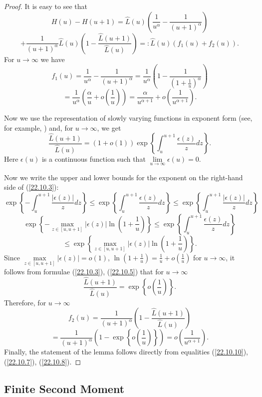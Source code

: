 \documentclass{article}
\theoremstyle{plain}
\theoremstyle{definition}
\theoremstyle{remark}
\newcommand{\beq}{\begin{equation}}
\newcommand{\eeq}{\end{equation}}
\begin{document}
\begin{proof}
It is easy to see that
$$
H(u)-H(u+1)=\widehat{L}(u)\left(\frac{1}{u^\alpha}-\frac{1}{(u+1)^\alpha}\right)
$$
\beq\label{22.10.10}
+\frac{1}{(u+1)^\alpha}\widehat{L}(u)\left(1-\frac{\widehat{L}(u+1)}{\widehat{L}(u)}\right)
=:\widehat{L}(u)(f_1(u)+f_2(u)).
\eeq
For $u\rightarrow\infty$ we have
$$
f_1(u)=\frac{1}{u^\alpha}-\frac{1}{(u+1)^\alpha}
=\frac{1}{u^\alpha}\left(1-\frac{1}{\left(1+\frac{1}{u}\right)^\alpha}\right)
$$
\beq\label{22.10.7}
=\frac{1}{u^\alpha}\left(\frac{\alpha}{u}+o\left(\frac{1}{u}\right)\right)
=\frac{\alpha}{u^{\alpha+1}}+o\left(\frac{1}{u^{\alpha+1}}\right).
\eeq

Now we use the representation of slowly varying functions in exponent form (see, for example, \citet[theorem 1.2]{seneta1985regularly}) and, for $u\rightarrow\infty$, we get
\beq\label{22.10.3}
\frac{\widehat{L}(u+1)}{\widehat{L}(u)}=(1+o(1))\exp\left\{\int_u^{u+1}\frac{\epsilon(z)}{z}dz\right\}.
\eeq
Here $\epsilon(u)$ is a continuous function such that $\lim\limits_{u\rightarrow\infty}\epsilon(u)=0$.

Now we write the upper and lower bounds for the exponent on the right-hand side of (\ref{22.10.3}):
$$
\exp\left\{-\int_u^{u+1}\frac{|\epsilon(z)|}{z}dz\right\}\leq
\exp\left\{\int_u^{u+1}\frac{\epsilon(z)}{z}dz\right\}
\leq\exp\left\{\int_u^{u+1}\frac{|\epsilon(z)|}{z}dz\right\}
$$
$$
\exp\left\{-\max\limits_{z\in[u,u+1]}|\epsilon(z)|\ln\left(1+\frac{1}{u}\right)\right\}\leq
\exp\left\{\int_u^{u+1}\frac{\epsilon(z)}{z}dz\right\}
$$
\beq\label{22.10.5}
\leq\exp\left\{\max\limits_{z\in[u,u+1]}|\epsilon(z)|\ln\left(1+\frac{1}{u}\right)\right\}.
\eeq
Since $\max\limits_{z\in[u,u+1]}|\epsilon(z)|=o(1)$, $\ln\left(1+\frac{1}{u}\right)=\frac{1}{u}+o(\frac{1}{u})$
for $u\rightarrow\infty$, it follows from formulae (\ref{22.10.3}), (\ref{22.10.5}) that for $u\rightarrow\infty$
$$
\frac{\widehat{L}(u+1)}{\widehat{L}(u)}=\exp\left\{o\left(\frac{1}{u}\right)\right\}.
$$
Therefore, for $u\rightarrow\infty$
$$
f_2(u)=\frac{1}{(u+1)^\alpha}\left(1-\frac{\widehat{L}(u+1)}{\widehat{L}(u)}\right)
$$
\beq\label{22.10.8}
=\frac{1}{(u+1)^\alpha}\left(1-\exp\left\{o\left(\frac{1}{u}\right)\right\}\right)
=o\left(\frac{1}{u^{\alpha+1}}\right).
\eeq
Finally, the statement of the lemma follows directly from equalities (\ref{22.10.10}), (\ref{22.10.7}), (\ref{22.10.8}).
\end{proof}


\subsection{Finite Second Moment}\label{sec_ap_2}
\end{document}
